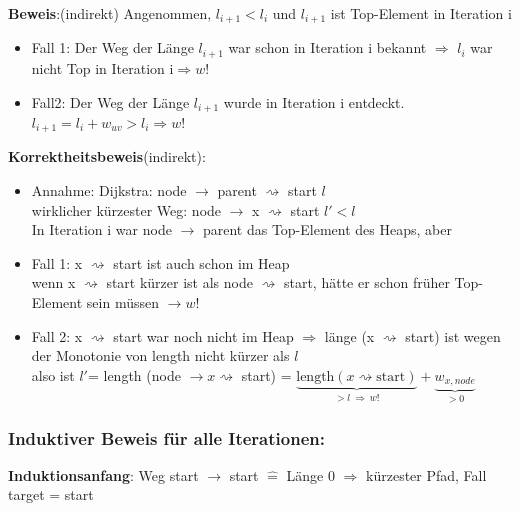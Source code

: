 \documentclass[11pt, fleqn]{scrreprt}
\begin{document}
        \textbf{Beweis}:(indirekt) Angenommen, $l_{i+1} < l_i$ und $l_{i+1}$ ist Top-Element in Iteration i
        \begin{itemize}
            \item Fall 1: Der Weg der Länge $l_{i+1}$ war schon in Iteration i bekannt $\Rightarrow$ $l_i$ war nicht Top in Iteration i$\Rightarrow w!$
            \item Fall2: Der Weg der Länge $l_{i+1}$ wurde in Iteration i entdeckt. $l_{i+1} = l_i + w_{uv} > l_i \Rightarrow w!$\\
        \end{itemize}

        \textbf{Korrektheitsbeweis}(indirekt):
        \begin{itemize}
            \item Annahme: Dijkstra: node $\rightarrow$ parent $\rightsquigarrow$ start \hspace*{1.2cm} $l$\\
            wirklicher kürzester Weg: node $\rightarrow$ x $\rightsquigarrow$ start \hspace*{1cm} $l' < l$\\
            In Iteration i war node $\rightarrow$ parent das Top-Element des Heaps, aber
            \item Fall 1: x $\rightsquigarrow$ start ist auch schon im Heap \\
            wenn x $\rightsquigarrow$ start kürzer ist als node $\rightsquigarrow$ start, hätte er schon früher Top-Element sein müssen $\rightarrow w!$
            \item Fall 2: x $\rightsquigarrow$ start war noch nicht im Heap $\Rightarrow$ länge (x $\rightsquigarrow$ start) ist wegen der Monotonie von length nicht kürzer als $l$\\
            also ist $l'$= length (node $\rightarrow x \rightsquigarrow$ start) = $\underbrace{\text{length}(x \rightsquigarrow \text{start})}_{> l \  \Rightarrow \ w!} + \underbrace{w_{x, node}}_{>0}$
        \end{itemize}

        \subsubsection*{Induktiver Beweis für alle Iterationen:}
        \textbf{Induktionsanfang}: Weg start $\rightarrow$ start $\widehat{=}$ Länge 0 $\Rightarrow$ kürzester Pfad, Fall target = start\\
\end{document}
